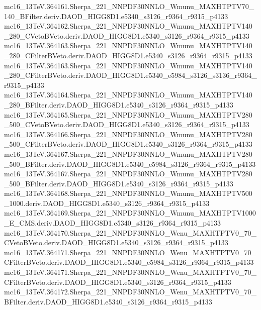 \begin{footnotesize}
mc16\_13TeV.364161.Sherpa\_221\_NNPDF30NNLO\_Wmunu\_MAXHTPTV70\_140\_BFilter.deriv.DAOD\_HIGG8D1.e5340\_s3126\_r9364\_r9315\_p4133 \\
mc16\_13TeV.364162.Sherpa\_221\_NNPDF30NNLO\_Wmunu\_MAXHTPTV140\_280\_CVetoBVeto.deriv.DAOD\_HIGG8D1.e5340\_s3126\_r9364\_r9315\_p4133 \\
mc16\_13TeV.364163.Sherpa\_221\_NNPDF30NNLO\_Wmunu\_MAXHTPTV140\_280\_CFilterBVeto.deriv.DAOD\_HIGG8D1.e5340\_s3126\_r9364\_r9315\_p4133 \\
mc16\_13TeV.364163.Sherpa\_221\_NNPDF30NNLO\_Wmunu\_MAXHTPTV140\_280\_CFilterBVeto.deriv.DAOD\_HIGG8D1.e5340\_e5984\_s3126\_s3136\_r9364\_r9315\_p4133 \\
mc16\_13TeV.364164.Sherpa\_221\_NNPDF30NNLO\_Wmunu\_MAXHTPTV140\_280\_BFilter.deriv.DAOD\_HIGG8D1.e5340\_s3126\_r9364\_r9315\_p4133 \\
mc16\_13TeV.364165.Sherpa\_221\_NNPDF30NNLO\_Wmunu\_MAXHTPTV280\_500\_CVetoBVeto.deriv.DAOD\_HIGG8D1.e5340\_s3126\_r9364\_r9315\_p4133 \\
mc16\_13TeV.364166.Sherpa\_221\_NNPDF30NNLO\_Wmunu\_MAXHTPTV280\_500\_CFilterBVeto.deriv.DAOD\_HIGG8D1.e5340\_s3126\_r9364\_r9315\_p4133 \\
mc16\_13TeV.364167.Sherpa\_221\_NNPDF30NNLO\_Wmunu\_MAXHTPTV280\_500\_BFilter.deriv.DAOD\_HIGG8D1.e5340\_e5984\_s3126\_r9364\_r9315\_p4133 \\
mc16\_13TeV.364167.Sherpa\_221\_NNPDF30NNLO\_Wmunu\_MAXHTPTV280\_500\_BFilter.deriv.DAOD\_HIGG8D1.e5340\_s3126\_r9364\_r9315\_p4133 \\
mc16\_13TeV.364168.Sherpa\_221\_NNPDF30NNLO\_Wmunu\_MAXHTPTV500\_1000.deriv.DAOD\_HIGG8D1.e5340\_s3126\_r9364\_r9315\_p4133 \\
mc16\_13TeV.364169.Sherpa\_221\_NNPDF30NNLO\_Wmunu\_MAXHTPTV1000\_E\_CMS.deriv.DAOD\_HIGG8D1.e5340\_s3126\_r9364\_r9315\_p4133 \\
mc16\_13TeV.364170.Sherpa\_221\_NNPDF30NNLO\_Wenu\_MAXHTPTV0\_70\_CVetoBVeto.deriv.DAOD\_HIGG8D1.e5340\_s3126\_r9364\_r9315\_p4133 \\
mc16\_13TeV.364171.Sherpa\_221\_NNPDF30NNLO\_Wenu\_MAXHTPTV0\_70\_CFilterBVeto.deriv.DAOD\_HIGG8D1.e5340\_e5984\_s3126\_r9364\_r9315\_p4133 \\
mc16\_13TeV.364171.Sherpa\_221\_NNPDF30NNLO\_Wenu\_MAXHTPTV0\_70\_CFilterBVeto.deriv.DAOD\_HIGG8D1.e5340\_s3126\_r9364\_r9315\_p4133 \\
mc16\_13TeV.364172.Sherpa\_221\_NNPDF30NNLO\_Wenu\_MAXHTPTV0\_70\_BFilter.deriv.DAOD\_HIGG8D1.e5340\_s3126\_r9364\_r9315\_p4133 \\

\end{footnotesize}
